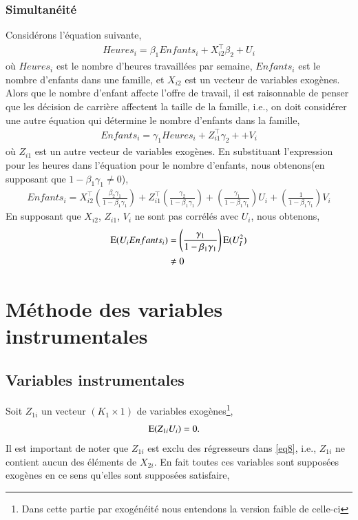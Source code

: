 \subsubsection*{Simultanéité}
Considérons l'équation suivante,
\begin{align*}
Heures_i = \beta_1Enfants_i + X_{i2}^\top\beta_2 + U_i
\end{align*}
où $Heures_i$ est le nombre d'heures travaillées par semaine, $Enfants_i$ est le nombre d'enfants dans une famille, et $X_{i2}$ est un vecteur de variables exogènes. Alors que le nombre d'enfant affecte l'offre de travail, il est raisonnable de penser que les décision de carrière affectent la taille de la famille, i.e., on doit considérer une autre équation qui détermine le nombre d'enfants dans la famille,
\begin{align*}
Enfants_i = \gamma_1 Heures_i + Z_{i1}^\top\gamma_2+ + V_i
\end{align*}
où $ Z_{i1}$ est un autre vecteur de variables exogènes. En substituant l'expression pour les heures dans l'équation pour le nombre d'enfants, nous obtenons(en supposant que $1-\beta_1\gamma_1\neq 0$),
\begin{align*}
Enfants_i  = X_{i2}^\top\left(\frac{\beta_2\gamma_1}{1-\beta_1\gamma_1}\right) + Z_{i1}^\top \left(\frac{\gamma_2}{1-\beta_1\gamma_1}\right) + \left(\frac{\gamma_1}{1-\beta_1\gamma_1}\right)U_i + \left(\frac{1}{1-\beta_1\gamma_1}\right)V_i
\end{align*}
En supposant que $X_{i2}$, $Z_{i1}$, $V_i$ ne sont pas corrélés avec $U_i$, nous obtenons,
\begin{align*}
\operatorname{E}(U_iEnfants_i) &= \left(\frac{\gamma_1}{1-\beta_1\gamma_1}\right)\operatorname{E}(U_I^2)\\
&\neq 0
\end{align*}

\section{Méthode des variables instrumentales}

\subsection{Variables instrumentales}
Soit $Z_{1i}$ un vecteur $(K_1\times 1)$ de 
variables exogènes\footnote{Dans cette partie par exogénéité nous entendons la version faible de celle-ci},
\begin{align*}
\operatorname{E}(Z_{1i}U_i) &= 0.
\end{align*}
Il est important de noter que  $Z_{1i}$ est exclu des régresseurs dans \eqref{eq8}, i.e., $Z_{1i}$ 
ne contient aucun des éléments de $X_{2i}$. En fait toutes ces variables sont supposées exogènes en ce sens 
qu'elles sont supposées satisfaire, 

